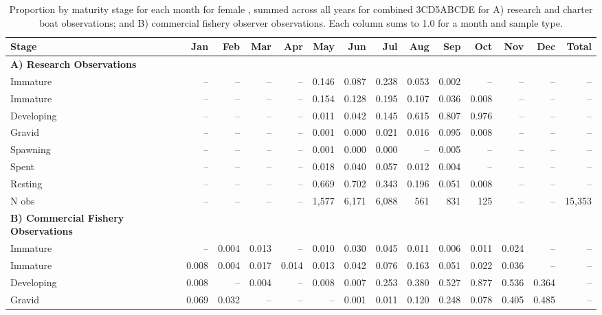 \begin{table}[b]
\tiny
\centering
\caption{\label{tab:maturityMonth} Proportion by maturity stage for each month for female \fishname, summed across all years for combined 3CD5ABCDE for A) research and charter boat observations; and B) commercial fishery observer observations. Each column sums to 1.0 for a month and sample type.}
\begin{tabular}{lrrrrrrrrrrrrr}
\hline
Stage      &   Jan &   Feb &   Mar &   Apr &   May &   Jun &   Jul &   Aug &   Sep &   Oct &   Nov &   Dec &  Total \\
\hline
\textbf{A) Research Observations} \\
Immature   &    -- &    -- &    -- &    -- & 0.146 & 0.087 & 0.238 & 0.053 & 0.002 &    -- &    -- &    -- &     -- \\
Immature   &    -- &    -- &    -- &    -- & 0.154 & 0.128 & 0.195 & 0.107 & 0.036 & 0.008 &    -- &    -- &     -- \\
Developing &    -- &    -- &    -- &    -- & 0.011 & 0.042 & 0.145 & 0.615 & 0.807 & 0.976 &    -- &    -- &     -- \\
Gravid     &    -- &    -- &    -- &    -- & 0.001 & 0.000 & 0.021 & 0.016 & 0.095 & 0.008 &    -- &    -- &     -- \\
Spawning   &    -- &    -- &    -- &    -- & 0.001 & 0.000 & 0.000 &    -- & 0.005 &    -- &    -- &    -- &     -- \\
Spent      &    -- &    -- &    -- &    -- & 0.018 & 0.040 & 0.057 & 0.012 & 0.004 &    -- &    -- &    -- &     -- \\
Resting    &    -- &    -- &    -- &    -- & 0.669 & 0.702 & 0.343 & 0.196 & 0.051 & 0.008 &    -- &    -- &     -- \\
N obs      &    -- &    -- &    -- &    -- & 1,577 & 6,171 & 6,088 &   561 &   831 &   125 &    -- &    -- & 15,353 \\
\hline
\textbf{B) Commercial Fishery Observations} \\
Immature   &    -- & 0.004 & 0.013 &    -- & 0.010 & 0.030 & 0.045 & 0.011 & 0.006 & 0.011 & 0.024 &    -- &     -- \\
Immature   & 0.008 & 0.004 & 0.017 & 0.014 & 0.013 & 0.042 & 0.076 & 0.163 & 0.051 & 0.022 & 0.036 &    -- &     -- \\
Developing & 0.008 &    -- & 0.004 &    -- & 0.008 & 0.007 & 0.253 & 0.380 & 0.527 & 0.877 & 0.536 & 0.364 &     -- \\
Gravid     & 0.069 & 0.032 &    -- &    -- &    -- & 0.001 & 0.011 & 0.120 & 0.248 & 0.078 & 0.405 & 0.485 &     -- \\

\end{tabular}
\end{table}
